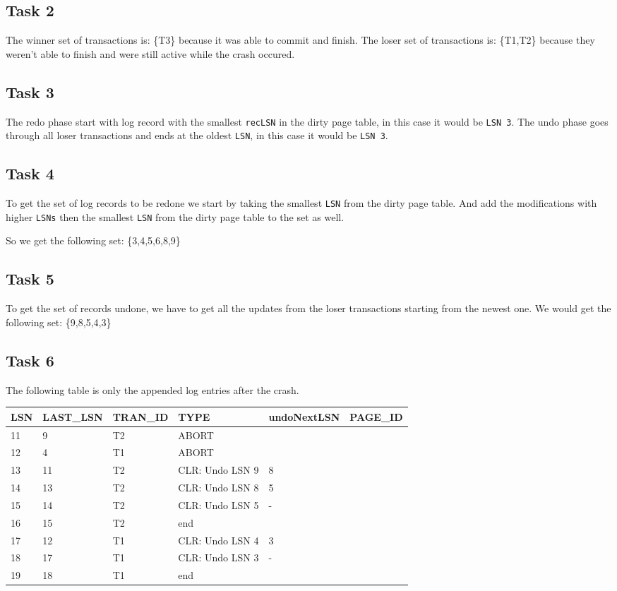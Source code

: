 \documentclass[12pt,a4paper]{article}
\begin{document}
\subsection{Task 2}
The winner set of transactions is: \{T3\} because it was able to commit and finish.
The loser set of transactions is: \{T1,T2\} because they weren't able to finish and were still active while the crash occured.

\subsection{Task 3}
The redo phase start with log record with the smallest \texttt{recLSN} in the dirty page table, in this case it would be \texttt{LSN 3}.
The undo phase goes through all loser transactions and ends at the oldest \texttt{LSN}, in this case it would be \texttt{LSN 3}.
\subsection{Task 4}
To get the set of log records to be redone we start by taking the smallest \texttt{LSN} from the dirty page table. And add the modifications with higher \texttt{LSNs} then the smallest \texttt{LSN} from the dirty page table to the set as well.

So we get the following set: \{3,4,5,6,8,9\}
\subsection{Task 5}
To get the set of records undone, we have to get all the updates from the loser transactions starting from the newest one.
We would get the following set: \{9,8,5,4,3\}
\subsection{Task 6}
The following table is only the appended log entries after the crash.
\begin{table}[!htbp]
    \centering
    \begin{tabularx}{\textwidth}{l|l|l|l|l|l}
        \hline
        LSN & LAST\_LSN & TRAN\_ID & TYPE & undoNextLSN & PAGE\_ID \\ 
        \hline
        11 & 9  & T2 & ABORT & & \\
      	12 & 4  & T1 & ABORT & & \\      
      	13 & 11 & T2 & CLR: Undo LSN 9 &  8 & \\
      	14 & 13 & T2 & CLR: Undo LSN 8 & 5 & \\
      	15 & 14 & T2 & CLR: Undo LSN 5 & - & \\
      	16 & 15 & T2 & end & & \\
      	17 & 12 & T1 & CLR: Undo LSN 4 & 3 & \\
      	18 & 17 & T1 & CLR: Undo LSN 3 & - & \\
      	19 & 18 & T1 & end & & \\     
        \hline
    \end{tabularx}
\end{table}
\end{document}

